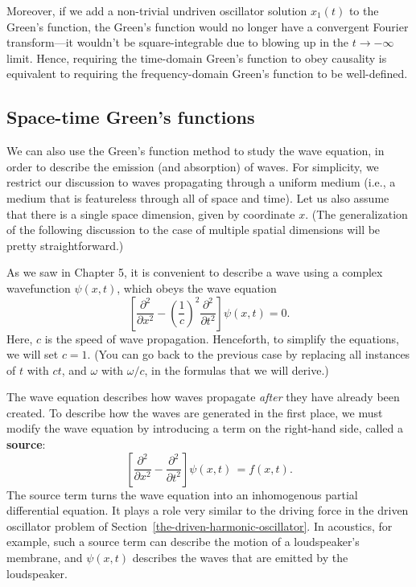\documentclass[10pt,a4paper]{article}
\begin{document}
Moreover, if we add a non-trivial undriven oscillator solution
$x_1(t)$ to the Green's function, the Green's function would no longer
have a convergent Fourier transform---it wouldn't be square-integrable
due to blowing up in the $t \rightarrow -\infty$ limit. Hence,
requiring the time-domain Green's function to obey causality is
equivalent to requiring the frequency-domain Green's function to be
well-defined.

\subsection{Space-time Green's functions}
\label{space-time-greens-functions}

We can also use the Green's function method to study the wave
equation, in order to describe the emission (and absorption) of
waves. For simplicity, we restrict our discussion to waves propagating
through a uniform medium (i.e., a medium that is featureless through
all of space and time). Let us also assume that there is a single
space dimension, given by coordinate $x$. (The generalization of the
following discussion to the case of multiple spatial dimensions will
be pretty straightforward.)

As we saw in Chapter 5, it is convenient to describe a wave using a
complex wavefunction $\psi(x,t)$, which obeys the wave equation
\begin{equation}
\left[\frac{\partial^2}{\partial x^2} - \left(\frac{1}{c}\right)^2 \frac{\partial^2}{\partial t^2} \right] \psi(x,t) = 0.
\end{equation}
Here, $c$ is the speed of wave propagation. Henceforth, to simplify
the equations, we will set $c = 1$. (You can go back to the previous
case by replacing all instances of $t$ with $c t$, and $\omega$
with $\omega/c$, in the formulas that we will derive.)

The wave equation describes how waves propagate \emph{after} they have
already been created. To describe how the waves are generated in the
first place, we must modify the wave equation by introducing a term on
the right-hand side, called a \textbf{source}:
\begin{equation}
\left[\frac{\partial^2}{\partial x^2} - \frac{\partial^2}{\partial t^2} \right] \psi(x,t)\, = f(x,t).
\end{equation}
The source term turns the wave equation into an inhomogenous partial
differential equation. It plays a role very similar to the driving
force in the driven oscillator problem of
Section~\ref{the-driven-harmonic-oscillator}.  In acoustics, for
example, such a source term can describe the motion of a loudspeaker's
membrane, and $\psi(x,t)$ describes the waves that are emitted by the
loudspeaker.
\end{document}
